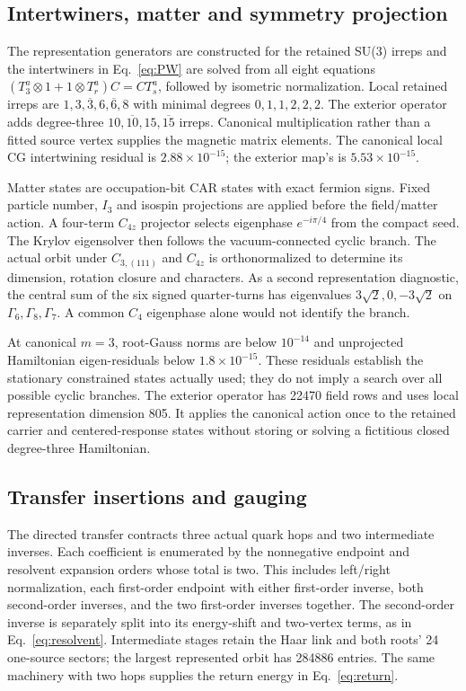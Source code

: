 \documentclass[11pt]{article}
\newcommand{\Ga}{\Gamma}
\begin{document}
\subsection{Intertwiners, matter and symmetry projection}
The representation generators are constructed for the retained SU(3) irreps and the intertwiners in Eq.~\eqref{eq:PW} are solved from all eight equations $(T^a_3\otimes1+1\otimes T^a_r)C=CT^a_s$, followed by isometric normalization. Local retained irreps are $1,3,\overline3,6,\overline6,8$ with minimal degrees $0,1,1,2,2,2$. The exterior operator adds degree-three $10,\overline{10},15,\overline{15}$ irreps. Canonical multiplication rather than a fitted source vertex supplies the magnetic matrix elements. The canonical local CG intertwining residual is $2.88\times10^{-15}$; the exterior map's is $5.53\times10^{-15}$.

Matter states are occupation-bit CAR states with exact fermion signs. Fixed particle number, $I_3$ and isospin projections are applied before the field/matter action. A four-term $C_{4z}$ projector selects eigenphase $e^{-i\pi/4}$ from the compact seed. The Krylov eigensolver then follows the vacuum-connected cyclic branch. The actual orbit under $C_{3,(111)}$ and $C_{4z}$ is orthonormalized to determine its dimension, rotation closure and characters. As a second representation diagnostic, the central sum of the six signed quarter-turns has eigenvalues $3\sqrt2,0,-3\sqrt2$ on $\Ga_6,\Ga_8,\Ga_7$. A common $C_4$ eigenphase alone would not identify the branch.

At canonical $m=3$, root-Gauss norms are below $10^{-14}$ and unprojected Hamiltonian eigen-residuals below $1.8\times10^{-15}$. These residuals establish the stationary constrained states actually used; they do not imply a search over all possible cyclic branches. The exterior operator has 22470 field rows and uses local representation dimension 805. It applies the canonical action once to the retained carrier and centered-response states without storing or solving a fictitious closed degree-three Hamiltonian.

\subsection{Transfer insertions and gauging}
The directed transfer contracts three actual quark hops and two intermediate inverses. Each coefficient is enumerated by the nonnegative endpoint and resolvent expansion orders whose total is two. This includes left/right normalization, each first-order endpoint with either first-order inverse, both second-order inverses, and the two first-order inverses together. The second-order inverse is separately split into its energy-shift and two-vertex terms, as in Eq.~\eqref{eq:resolvent}. Intermediate stages retain the Haar link and both roots' 24 one-source sectors; the largest represented orbit has 284886 entries. The same machinery with two hops supplies the return energy in Eq.~\eqref{eq:return}.
\end{document}
